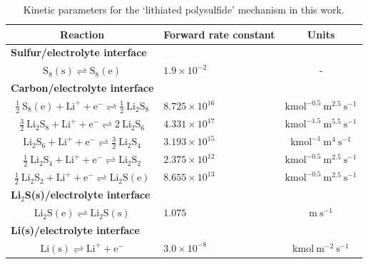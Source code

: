 \documentclass{elsarticle}
\begin{document}
\begin{table}[h!]
\begin{center}
\begin{tabular}{ clc } 
 \hline\hline
 Reaction & Forward rate constant & Units \\ 
 \hline
 \multicolumn{1}{l}{\bf Sulfur/electrolyte interface} & &   \\
 $\mathrm{S}_8(\mathrm{s}) \rightleftharpoons \mathrm{S}_8(\mathrm{e})$  & $1.9 \times 10^{-2}$ & - \\ 
 \hline
 \multicolumn{1}{l}{\bf Carbon/electrolyte interface} & & \\
 $\frac{1}{2} ~ \mathrm{S}_8(\mathrm{e}) + \mathrm{Li}^+ + \mathrm{e}^- \rightleftharpoons \frac{1}{2} ~ \mathrm{Li}_2\mathrm{S}_8$ & $8.725 \times 10^{16}$ & $\mathrm{kmol}^{-0.5} ~ \mathrm{m}^{2.5} ~ \mathrm{s}^{-1}$   \\
 
 $\frac{3}{2} ~ \mathrm{Li}_2\mathrm{S}_8 + \mathrm{Li}^+ + \mathrm{e}^- \rightleftharpoons 2 ~ \mathrm{Li}_2\mathrm{S}_6$ & $4.331 \times 10^{17}$ & $\mathrm{kmol}^{-1.5} ~ \mathrm{m}^{5.5} ~ \mathrm{s}^{-1}$  \\
 
 $\mathrm{Li}_2\mathrm{S}_6 + \mathrm{Li}^+ + \mathrm{e}^- \rightleftharpoons \frac{3}{2} ~ \mathrm{Li}_2\mathrm{S}_4$ & $3.193 \times 10^{15}$ & $\mathrm{kmol}^{-1} ~ \mathrm{m}^{4} ~ \mathrm{s}^{-1}$  \\
 
 $\frac{1}{2} ~ \mathrm{Li}_2\mathrm{S}_4 + \mathrm{Li}^+ + \mathrm{e}^- \rightleftharpoons  \mathrm{Li}_2\mathrm{S}_2$ & $2.375 \times 10^{12}$ & $ \mathrm{kmol}^{-0.5} ~ \mathrm{m}^{2.5} ~ \mathrm{s}^{-1}$  \\
 
 $\frac{1}{2} ~ \mathrm{Li}_2\mathrm{S}_2 + \mathrm{Li}^+ + \mathrm{e}^- \rightleftharpoons  \mathrm{Li}_2\mathrm{S}(\mathrm{e})$ & $8.655 \times 10^{13}$ & $ \mathrm{kmol}^{-0.5} ~ \mathrm{m}^{2.5} ~ \mathrm{s}^{-1}$  \\
 \hline
 \multicolumn{1}{l}{\bf Li$_2$S(s)/electrolyte interface} & &  \\
 $\mathrm{Li}_2\mathrm{S}(\mathrm{e}) \rightleftharpoons \mathrm{Li}_2\mathrm{S}(\mathrm{s})$ & $1.075 $ & $ \mathrm{m} ~ \mathrm{s}^{-1}$  \\
 \hline
 \multicolumn{1}{l}{\bf Li(s)/electrolyte interface} & & 
\\
 $\mathrm{Li}(\mathrm{s}) \rightleftharpoons \mathrm{Li}^+ + \mathrm{e}^-$ & $3.0 \times 10^{-8}$ & $\mathrm{kmol} ~ \mathrm{m}^{-2} ~ \mathrm{s}^{-1}$  \\
 \hline\hline
 \end{tabular}
 \caption{Kinetic parameters for the `lithiated polysulfide' mechanism in this work.}
\label{tab:lithiated_kinetics}
\end{center}
 \end{table}
\end{document}
